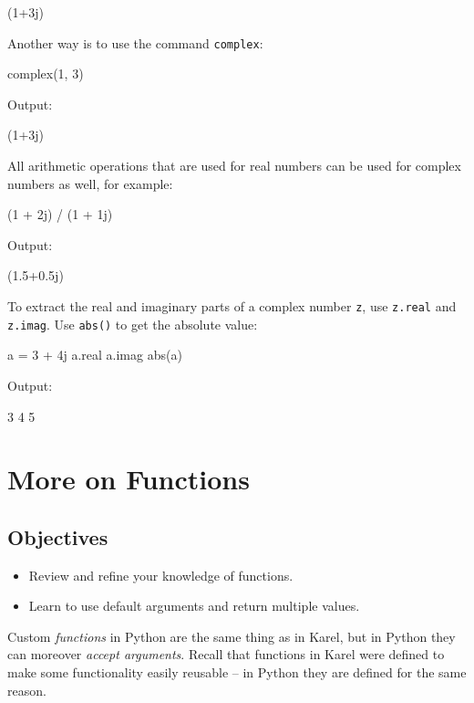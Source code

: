 \begin{bluecode}
(1+3j)
\end{bluecode}
Another way is to use the command {\tt complex}:

\begin{bluecode}
complex(1, 3)
\end{bluecode}
Output:

\begin{bluecode}
(1+3j)
\end{bluecode}
All arithmetic operations that are used for real numbers can be 
used for complex numbers as well, for example:

\begin{bluecode}
(1 + 2j) / (1 + 1j)
\end{bluecode}
Output:

\begin{bluecode}
(1.5+0.5j)
\end{bluecode}
To extract the real and imaginary parts of a complex number {\tt z}, use {\tt z.real}
and {\tt z.imag}. Use {\tt abs()} to get the absolute value:

\begin{bluecode}
a = 3 + 4j
a.real
a.imag
abs(a)
\end{bluecode}
Output:

\begin{bluecode}
3
4
5
\end{bluecode}


\section{More on Functions}

\subsection{Objectives}

\begin{itemize}
\item Review and refine your knowledge of functions.
\item Learn to use default arguments and return multiple values.
\end{itemize}
Custom {\em functions} in Python are the same thing as in Karel, 
but in Python they can moreover {\em accept arguments}. Recall that 
functions in Karel were defined to make some functionality easily 
reusable -- in Python they are defined for the same reason.

